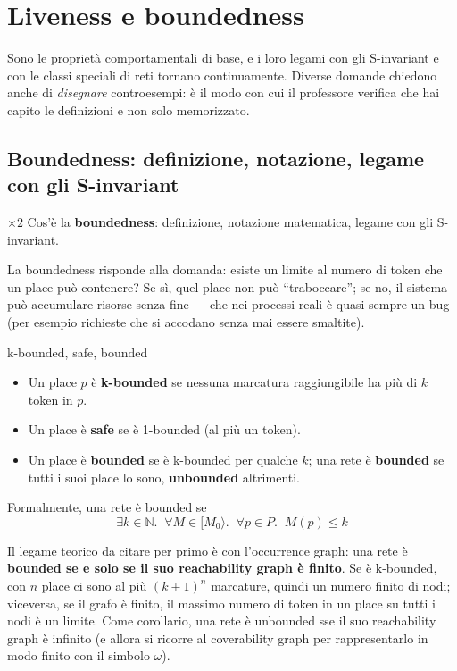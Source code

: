 \chapter{Liveness e boundedness}

Sono le proprietà comportamentali di base, e i loro legami con gli S-invariant e con le classi speciali di reti tornano continuamente. Diverse domande chiedono anche di \emph{disegnare} controesempi: è il modo con cui il professore verifica che hai capito le definizioni e non solo memorizzato.

\section{Boundedness: definizione, notazione, legame con gli S-invariant}

\begin{domanda}{$\times 2$}
Cos'è la \textbf{boundedness}: definizione, notazione matematica, legame con gli S-invariant.
\end{domanda}

La boundedness risponde alla domanda: esiste un limite al numero di token che un place può contenere? Se sì, quel place non può ``traboccare''; se no, il sistema può accumulare risorse senza fine — che nei processi reali è quasi sempre un bug (per esempio richieste che si accodano senza mai essere smaltite).

\begin{definizione}{k-bounded, safe, bounded}
\begin{itemize}
  \item Un place $p$ è \textbf{k-bounded} se nessuna marcatura raggiungibile ha più di $k$ token in $p$.
  \item Un place è \textbf{safe} se è 1-bounded (al più un token).
  \item Un place è \textbf{bounded} se è k-bounded per qualche $k$; una rete è \textbf{bounded} se tutti i suoi place lo sono, \textbf{unbounded} altrimenti.
\end{itemize}
Formalmente, una rete è bounded se
$$\exists k \in \mathbb{N}.\;\; \forall M \in [M_0\rangle.\;\; \forall p \in P.\;\; M(p) \le k$$
\end{definizione}

Il legame teorico da citare per primo è con l'occurrence graph: una rete è \textbf{bounded se e solo se il suo reachability graph è finito}. Se è k-bounded, con $n$ place ci sono al più $(k+1)^n$ marcature, quindi un numero finito di nodi; viceversa, se il grafo è finito, il massimo numero di token in un place su tutti i nodi è un limite. Come corollario, una rete è unbounded sse il suo reachability graph è infinito (e allora si ricorre al coverability graph per rappresentarlo in modo finito con il simbolo $\omega$).

